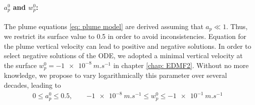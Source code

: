 \documentclass[draft]{agujournal2019}
\newcommand{\blu}[1]{{\color{BlueGreen} #1}}
\begin{document}
\paragraph{$a_p^0$ and $w_p^0$:}
%
The plume equations \eqref{eq: plume model} are derived assuming that $a_p \ll 1$. Thus, we restrict its surface value to 0.5 in order to avoid inconsistencies. Equation for the plume vertical velocity can lead to positive and negative solutions. In order to select negative solutions of the ODE, we adopted a minimal vertical velocity at the surface $w_p^0= \SI{-1e-8}{m.s^{-1}}$ in chapter \ref{chap: EDMF2}. Without no more knowledge, we propose to vary logarithmically this parameter over several decades, leading to
\begin{eqnarray*}
    0 \leq a_p^0 \leq 0.5, \qquad \SI{-1e-8}{m.s^{-1}} \leq w_p^0 \leq \SI{-1e-1}{m.s^{-1}}
\end{eqnarray*}
%
%
%
\end{document}
